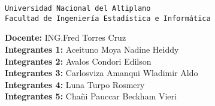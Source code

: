 \documentclass{article}
\begin{document}
\begin{center}
    {\Large \texttt{Universidad Nacional del Altiplano\\Facultad de Ingeniería Estadística e Informática}}
\end{center}
\vspace{5mm}
\noindent\textbf{Docente:}  ING.Fred Torres Cruz\\
\vspace{5mm}
\vspace{5mm}
\noindent\textbf{Integrantes 1:}  Aceituno Moya Nadine Heiddy \\
\vspace{5mm}
\vspace{5mm}
\noindent\textbf{Integrantes 2:}  Avalos Condori Edilson  \\
\vspace{5mm}
\vspace{5mm}
\noindent\textbf{Integrantes 3:}  Carlosviza Amanqui Wladimir Aldo \\
\vspace{5mm}
\vspace{5mm}
\noindent\textbf{Integrantes 4:} Luna Turpo Rosmery \\
\vspace{5mm}
\vspace{5mm}
\noindent\textbf{Integrantes 5:}  Chañi Pauccar Beckham Vieri \\
\vspace{5mm}
\end{document}
